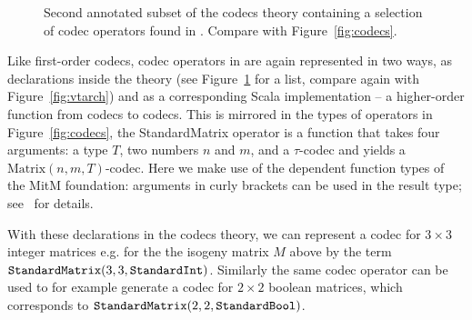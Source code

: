 \begin{figure}[ht]\centering
  \caption[List of Codec Operators]{
    Second annotated subset of the codecs theory containing a selection of codec operators found in \mmt. 
    Compare with Figure~\ref{fig:codecs}. 
  }
  \label{fig:codecops}
\end{figure}
Like first-order codecs, codec operators in \mmt are again represented in two ways, as declarations inside the  theory (see Figure~\ref{fig:codecops} for a list, compare again with Figure~\ref{fig:vtarch}) and as a corresponding Scala implementation -- a higher-order function from codecs to codecs. 
This is mirrored in the types of operators in Figure~\ref{fig:codecs}, the \textsf{StandardMatrix} operator is a function that takes four arguments: a type $T$, two
numbers $n$ and $m$, and a $\tau$-codec and yields a $\mathrm{Matrix}(n, m, T)$-codec. 
Here we make use of the dependent function types of the MitM foundation: arguments in curly brackets can be used in the result type; see~\cite{RabKoh:WSMSML13} for details.

With these declarations in the \textsf{codecs} theory, we can represent a codec for $3 \times 3$ integer matrices e.g. for the the isogeny matrix $M$ above by the \ommt term $\plaintt{StandardMatrix}(3, 3, \plaintt{StandardInt})$.
Similarly the same codec operator can be used to for example generate a codec for $2 \times 2$ boolean matrices, which corresponds to
$\plaintt{StandardMatrix}(2, 2, \plaintt{StandardBool})$. 

